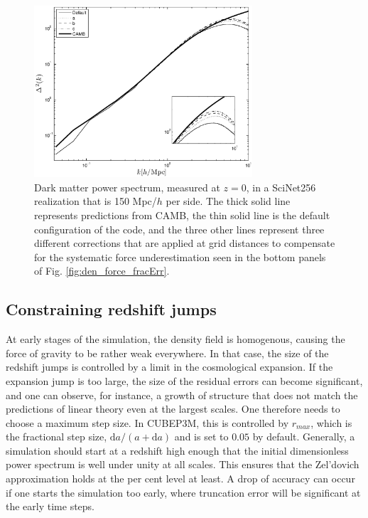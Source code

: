 \documentclass[useAMS,usenatbib]{mn2e}
\begin{document}
\begin{figure}%
  \begin{center}
    \includegraphics[width=3.2in]{graphs/power_fudge.eps}
  \caption{Dark matter power spectrum, measured at $z=0$, in a SciNet256 realization that is 150 Mpc/$h$ per side. 
  The thick solid line represents predictions from {\small CAMB}, the thin solid line is the default configuration of the code, and the three other lines represent
  three different corrections that are applied at grid distances to compensate for the systematic force underestimation seen in the bottom panels of Fig. \ref{fig:den_force_fracErr}. }
\end{center}
\end{figure}


\subsection{Constraining redshift jumps}
\label{subsec:z_jumps}


At early stages of the simulation, the density field is homogenous, causing the force of gravity to be
rather weak everywhere. In that case, the size of the redshift jumps is controlled by a limit in the cosmological expansion.
If the expansion jump is too large, the size of the residual errors can become significant, and one can observe, for instance,
a growth of structure that does not match the predictions of  linear theory even at the largest scales.
One therefore needs to choose a maximum step size. In {\small CUBEP3M}, this is controlled by $r_{max}$, which is the fractional step size,
$\mbox{d}a/(a + \mbox{d}a)$ and is set to $0.05$ by default.  Generally, a simulation should start at a redshift high enough that
the initial dimensionless power spectrum is well under unity at all scales. This ensures that the Zel'dovich approximation
 holds at the per cent level at least. A drop of accuracy can occur if one starts the simulation too early, where
 truncation error will be significant at the early time steps.
\end{document}
